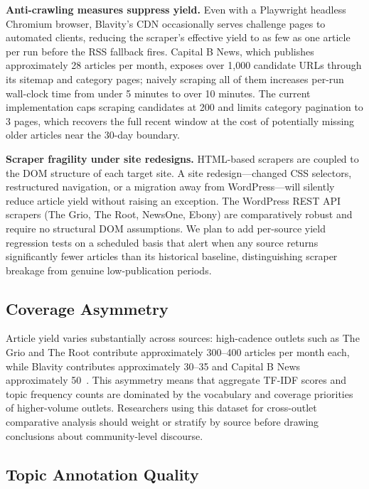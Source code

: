 \documentclass[sigconf,anonymous]{acmart}
\begin{document}
\noindent\textbf{Anti-crawling measures suppress yield.}
Even with a Playwright headless Chromium browser, Blavity's CDN occasionally
serves challenge pages to automated clients, reducing the scraper's effective
yield to as few as one article per run before the RSS fallback fires.
Capital B News, which publishes approximately 28 articles per month, exposes
over 1,000 candidate URLs through its sitemap and category pages; naively
scraping all of them increases per-run wall-clock time from under 5 minutes to
over 10 minutes.
The current implementation caps scraping candidates at 200 and limits category
pagination to 3 pages, which recovers the full recent window at the cost of
potentially missing older articles near the 30-day boundary.

\noindent\textbf{Scraper fragility under site redesigns.}
HTML-based scrapers are coupled to the DOM structure of each target site.
A site redesign---changed CSS selectors, restructured navigation, or a migration
away from WordPress---will silently reduce article yield without raising an
exception.
The WordPress REST API scrapers (The Grio, The Root, NewsOne, Ebony) are
comparatively robust and require no structural DOM assumptions.
We plan to add per-source yield regression tests on a scheduled basis that
alert when any source returns significantly fewer articles than its historical
baseline, distinguishing scraper breakage from genuine low-publication periods.

\subsection{Coverage Asymmetry}

Article yield varies substantially across sources: high-cadence outlets such as
The Grio and The Root contribute approximately 300--400 articles per month each,
while Blavity contributes approximately 30--35 and Capital B News approximately
50~\cite{cuny2022black}.
This asymmetry means that aggregate TF-IDF scores and topic frequency counts
are dominated by the vocabulary and coverage priorities of higher-volume outlets.
Researchers using this dataset for cross-outlet comparative analysis should
weight or stratify by source before drawing conclusions about community-level
discourse.

\subsection{Topic Annotation Quality}
\end{document}

